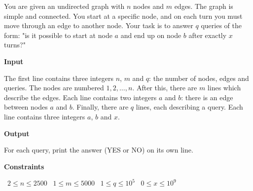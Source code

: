 You are given an undirected graph with $n$ nodes and $m$ edges. The graph is simple and connected.
You start at a specific node, and on each turn
you must move through an edge to another node.
Your task is to answer $q$ queries of the form: "is it possible to start at node $a$ and end up on node $b$ after exactly $x$ turns?"

\vspace{0.3cm}\noindent\textbf{Input}

The first line contains three integers $n$, $m$ and $q$:
the number of nodes, edges and queries. The nodes are numbered $1,2,\dots,n$.
After this, there are $m$ lines which describe the edges. Each line contains two integers $a$ and $b$: there is an edge between nodes $a$ and $b$.
Finally, there are $q$ lines, each describing a query.
Each line contains three integers $a$, $b$ and $x$.

\vspace{0.3cm}\noindent\textbf{Output}

For each query, print the answer (YES or NO) on its own line.

\vspace{0.3cm}\noindent\textbf{Constraints}

\textbullet\ $2 \le n \le 2500$
\textbullet\ $1 \le m \le 5000$
\textbullet\ $1 \le q \le 10^5$
\textbullet\ $0 \le x \le 10^9$